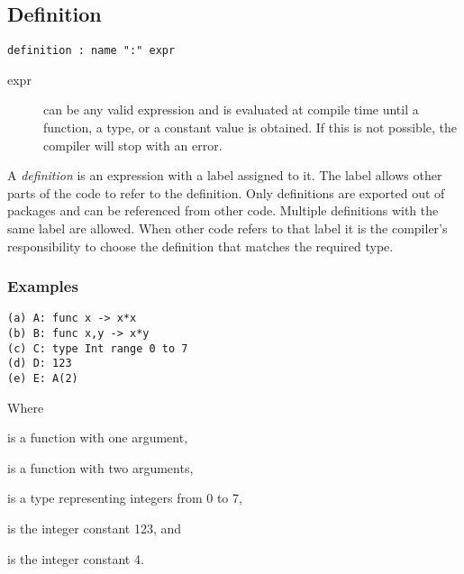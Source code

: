 \subsection{Definition}

\begin{lstlisting}[language=EBNF]
definition : name ":" expr
\end{lstlisting}

\begin{description}
\item[expr] can be any valid expression and is evaluated at compile time until a
            function, a type, or a constant value is obtained. If this is not
            possible, the compiler will stop with an error.
\end{description}

A \emph{definition} is an expression with a label assigned to it. The label
allows other parts of the code to refer to the definition. Only definitions are
exported out of packages and can be referenced from other code. Multiple
definitions with the same label are allowed. When other code refers to that
label it is the compiler's responsibility to choose the definition that matches
the required type.

\subsubsection{Examples}
\begin{lstlisting}
(a) A: func x -> x*x
(b) B: func x,y -> x*y
(c) C: type Int range 0 to 7
(d) D: 123
(e) E: A(2)
\end{lstlisting}

Where \begin{exdesc}
	\item is a function with one argument,
	\item is a function with two arguments,
	\item is a type representing integers from 0 to 7,
	\item is the integer constant 123, and
	\item is the integer constant 4.
\end{exdesc}
